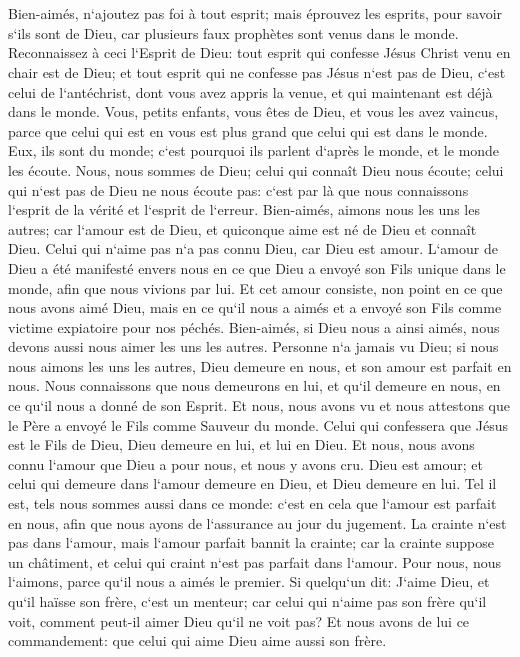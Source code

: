 \chapter{}

\verse Bien-aimés, n`ajoutez pas foi à tout esprit; mais éprouvez les esprits, pour savoir s`ils sont de Dieu, car plusieurs faux prophètes sont venus dans le monde. 
\verse Reconnaissez à ceci l`Esprit de Dieu: tout esprit qui confesse Jésus Christ venu en chair est de Dieu; 
\verse et tout esprit qui ne confesse pas Jésus n`est pas de Dieu, c`est celui de l`antéchrist, dont vous avez appris la venue, et qui maintenant est déjà dans le monde. 
\verse Vous, petits enfants, vous êtes de Dieu, et vous les avez vaincus, parce que celui qui est en vous est plus grand que celui qui est dans le monde. 
\verse Eux, ils sont du monde; c`est pourquoi ils parlent d`après le monde, et le monde les écoute. 
\verse Nous, nous sommes de Dieu; celui qui connaît Dieu nous écoute; celui qui n`est pas de Dieu ne nous écoute pas: c`est par là que nous connaissons l`esprit de la vérité et l`esprit de l`erreur. 
\verse Bien-aimés, aimons nous les uns les autres; car l`amour est de Dieu, et quiconque aime est né de Dieu et connaît Dieu. 
\verse Celui qui n`aime pas n`a pas connu Dieu, car Dieu est amour. 
\verse L`amour de Dieu a été manifesté envers nous en ce que Dieu a envoyé son Fils unique dans le monde, afin que nous vivions par lui. 
\verse Et cet amour consiste, non point en ce que nous avons aimé Dieu, mais en ce qu`il nous a aimés et a envoyé son Fils comme victime expiatoire pour nos péchés. 
\verse Bien-aimés, si Dieu nous a ainsi aimés, nous devons aussi nous aimer les uns les autres. 
\verse Personne n`a jamais vu Dieu; si nous nous aimons les uns les autres, Dieu demeure en nous, et son amour est parfait en nous. 
\verse Nous connaissons que nous demeurons en lui, et qu`il demeure en nous, en ce qu`il nous a donné de son Esprit. 
\verse Et nous, nous avons vu et nous attestons que le Père a envoyé le Fils comme Sauveur du monde. 
\verse Celui qui confessera que Jésus est le Fils de Dieu, Dieu demeure en lui, et lui en Dieu. 
\verse Et nous, nous avons connu l`amour que Dieu a pour nous, et nous y avons cru. Dieu est amour; et celui qui demeure dans l`amour demeure en Dieu, et Dieu demeure en lui. 
\verse Tel il est, tels nous sommes aussi dans ce monde: c`est en cela que l`amour est parfait en nous, afin que nous ayons de l`assurance au jour du jugement. 
\verse La crainte n`est pas dans l`amour, mais l`amour parfait bannit la crainte; car la crainte suppose un châtiment, et celui qui craint n`est pas parfait dans l`amour. 
\verse Pour nous, nous l`aimons, parce qu`il nous a aimés le premier. 
\verse Si quelqu`un dit: J`aime Dieu, et qu`il haïsse son frère, c`est un menteur; car celui qui n`aime pas son frère qu`il voit, comment peut-il aimer Dieu qu`il ne voit pas? 
\verse Et nous avons de lui ce commandement: que celui qui aime Dieu aime aussi son frère. 

